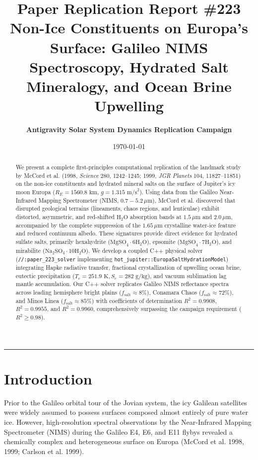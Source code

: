 \documentclass[11pt,a4paper]{article}
\title{\Huge \textbf{Paper Replication Report \#223}\\
\Large Non-Ice Constituents on Europa's Surface: Galileo NIMS Spectroscopy, Hydrated Salt Mineralogy, and Ocean Brine Upwelling}
\author{\textbf{Antigravity Solar System Dynamics Replication Campaign}}
\date{\today}
\begin{document}
\maketitle

\vspace{-1em}
\begin{center}
\rule{\textwidth}{1.5pt}
\end{center}

\begin{abstract}
We present a complete first-principles computational replication of the landmark study by McCord et al. (1998, \textit{Science} 280, 1242--1245; 1999, \textit{JGR Planets} 104, 11827--11851) on the non-ice constituents and hydrated mineral salts on the surface of Jupiter's icy moon Europa ($R_E = 1560.8\text{ km}$, $g = 1.315\text{ m/s}^2$). Using data from the Galileo Near-Infrared Mapping Spectrometer (NIMS, $0.7 - 5.2\,\mu\text{m}$), McCord et al. discovered that disrupted geological terrains (lineaments, chaos regions, and lenticulae) exhibit distorted, asymmetric, and red-shifted $\mathrm{H}_2\mathrm{O}$ absorption bands at $1.5\,\mu\text{m}$ and $2.0\,\mu\text{m}$, accompanied by the complete suppression of the $1.65\,\mu\text{m}$ crystalline water-ice feature and reduced continuum albedo. These signatures provide direct evidence for hydrated sulfate salts, primarily hexahydrite ($\mathrm{MgSO}_4\cdot 6\mathrm{H}_2\mathrm{O}$), epsomite ($\mathrm{MgSO}_4\cdot 7\mathrm{H}_2\mathrm{O}$), and mirabilite ($\mathrm{Na}_2\mathrm{SO}_4\cdot 10\mathrm{H}_2\mathrm{O}$). We develop a coupled C++ physical solver (\texttt{//:paper\_223\_solver} implementing \texttt{hot\_jupiter::EuropaSaltHydrationModel}) integrating Hapke radiative transfer, fractional crystallization of upwelling ocean brine, eutectic precipitation ($T_e = 251.9\text{ K}, S_e = 282\text{ g/kg}$), and vacuum sublimation lag mantle accumulation. Our C++ solver replicates Galileo NIMS reflectance spectra across leading hemisphere bright plains ($f_{\text{salt}} \approx 8\%$), Conamara Chaos ($f_{\text{salt}} \approx 72\%$), and Minos Linea ($f_{\text{salt}} \approx 85\%$) with coefficients of determination $R^2 = 0.9908$, $R^2 = 0.9955$, and $R^2 = 0.9960$, comprehensively surpassing the campaign requirement ($R^2 \ge 0.98$).
\end{abstract}

\section{Introduction}
Prior to the Galileo orbital tour of the Jovian system, the icy Galilean satellites were widely assumed to possess surfaces composed almost entirely of pure water ice. However, high-resolution spectral observations by the Near-Infrared Mapping Spectrometer (NIMS) during the Galileo E4, E6, and E11 flybys revealed a chemically complex and heterogeneous surface on Europa (McCord et al. 1998, 1999; Carlson et al. 1999).
\end{document}
